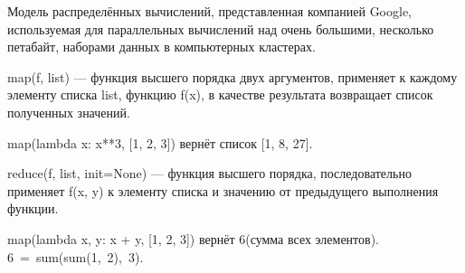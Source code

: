 \begin{definition}[MapReduce]
  Модель распределённых вычислений, представленная
  компанией Google, используемая для параллельных вычислений над очень
  большими, несколько петабайт, наборами данных в компьютерных кластерах.
\end{definition}

\begin{definition}[Map]
  map(f, list) --- функция высшего порядка двух аргументов, применяет к каждому
  элементу списка list, функцию f(x), в качестве результата возвращает список
  полученных значений.
\end{definition}

\begin{example}
  map(lambda x: x**3, [1, 2, 3]) вернёт список [1, 8, 27].
\end{example}

\begin{definition}[Reduce]
  reduce(f, list, init=None) --- функция высшего порядка, последовательно
  применяет f(x, y) к элементу списка и значению от предыдущего выполнения
  функции.
\end{definition}

\begin{example}
  map(lambda x, y: x + y, [1, 2, 3]) вернёт 6(сумма всех элементов).
  6~=~sum(sum(1,~2),~3).
\end{example}

